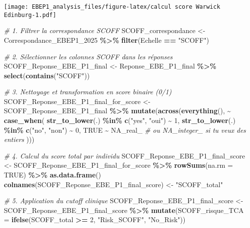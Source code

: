 \documentclass[
]{article}
\newenvironment{Shaded}{\begin{snugshade}}{\end{snugshade}}
\newcommand{\AttributeTok}[1]{\textcolor[rgb]{0.13,0.29,0.53}{#1}}
\newcommand{\CommentTok}[1]{\textcolor[rgb]{0.56,0.35,0.01}{\textit{#1}}}
\newcommand{\ConstantTok}[1]{\textcolor[rgb]{0.56,0.35,0.01}{#1}}
\newcommand{\DecValTok}[1]{\textcolor[rgb]{0.00,0.00,0.81}{#1}}
\newcommand{\FunctionTok}[1]{\textcolor[rgb]{0.13,0.29,0.53}{\textbf{#1}}}
\newcommand{\NormalTok}[1]{#1}
\newcommand{\OtherTok}[1]{\textcolor[rgb]{0.56,0.35,0.01}{#1}}
\newcommand{\SpecialCharTok}[1]{\textcolor[rgb]{0.81,0.36,0.00}{\textbf{#1}}}
\newcommand{\StringTok}[1]{\textcolor[rgb]{0.31,0.60,0.02}{#1}}
\begin{document}
\texttt{[image: EBEP1\_analysis\_files/figure-latex/calcul score Warwick Edinburg-1.pdf]}

\begin{Shaded}
\begin{Highlighting}[]
\CommentTok{\# 1. Filtrer la correspondance SCOFF}
\NormalTok{SCOFF\_correspondance }\OtherTok{\textless{}{-}}\NormalTok{ Correspondance\_EBEP1\_2025 }\SpecialCharTok{\%\textgreater{}\%}
  \FunctionTok{filter}\NormalTok{(Echelle }\SpecialCharTok{==} \StringTok{"SCOFF"}\NormalTok{)}

\CommentTok{\# 2. Sélectionner les colonnes SCOFF dans les réponses}
\NormalTok{SCOFF\_Reponse\_EBE\_P1\_final }\OtherTok{\textless{}{-}}\NormalTok{ Reponse\_EBE\_P1\_final }\SpecialCharTok{\%\textgreater{}\%}
  \FunctionTok{select}\NormalTok{(}\FunctionTok{contains}\NormalTok{(}\StringTok{"SCOFF"}\NormalTok{))}

\CommentTok{\# 3. Nettoyage et transformation en score binaire (0/1)}
\NormalTok{SCOFF\_Reponse\_EBE\_P1\_final\_for\_score }\OtherTok{\textless{}{-}}\NormalTok{ SCOFF\_Reponse\_EBE\_P1\_final }\SpecialCharTok{\%\textgreater{}\%}
  \FunctionTok{mutate}\NormalTok{(}\FunctionTok{across}\NormalTok{(}\FunctionTok{everything}\NormalTok{(), }\SpecialCharTok{\textasciitilde{}} \FunctionTok{case\_when}\NormalTok{(}
    \FunctionTok{str\_to\_lower}\NormalTok{(.) }\SpecialCharTok{\%in\%} \FunctionTok{c}\NormalTok{(}\StringTok{"yes"}\NormalTok{, }\StringTok{"oui"}\NormalTok{) }\SpecialCharTok{\textasciitilde{}} \DecValTok{1}\NormalTok{,}
    \FunctionTok{str\_to\_lower}\NormalTok{(.) }\SpecialCharTok{\%in\%} \FunctionTok{c}\NormalTok{(}\StringTok{"no"}\NormalTok{, }\StringTok{"non"}\NormalTok{) }\SpecialCharTok{\textasciitilde{}} \DecValTok{0}\NormalTok{,}
    \ConstantTok{TRUE} \SpecialCharTok{\textasciitilde{}} \ConstantTok{NA\_real\_}  \CommentTok{\# ou NA\_integer\_ si tu veux des entiers}
\NormalTok{  )))}

\CommentTok{\# 4. Calcul du score total par individu}
\NormalTok{SCOFF\_Reponse\_EBE\_P1\_final\_score }\OtherTok{\textless{}{-}}\NormalTok{ SCOFF\_Reponse\_EBE\_P1\_final\_for\_score }\SpecialCharTok{\%\textgreater{}\%}
  \FunctionTok{rowSums}\NormalTok{(}\AttributeTok{na.rm =} \ConstantTok{TRUE}\NormalTok{) }\SpecialCharTok{\%\textgreater{}\%}
  \FunctionTok{as.data.frame}\NormalTok{()}
\FunctionTok{colnames}\NormalTok{(SCOFF\_Reponse\_EBE\_P1\_final\_score) }\OtherTok{\textless{}{-}} \StringTok{"SCOFF\_total"}

\CommentTok{\# 5. Application du cutoff clinique}
\NormalTok{SCOFF\_Reponse\_EBE\_P1\_final\_score }\OtherTok{\textless{}{-}}\NormalTok{ SCOFF\_Reponse\_EBE\_P1\_final\_score }\SpecialCharTok{\%\textgreater{}\%}
  \FunctionTok{mutate}\NormalTok{(}\AttributeTok{SCOFF\_risque\_TCA =} \FunctionTok{ifelse}\NormalTok{(SCOFF\_total }\SpecialCharTok{\textgreater{}=} \DecValTok{2}\NormalTok{, }\StringTok{"Risk\_SCOFF"}\NormalTok{, }\StringTok{"No\_Risk"}\NormalTok{))}


\end{Highlighting}
\end{Shaded}
\end{document}
